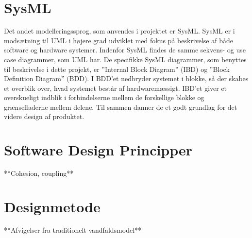 \section{SysML}
Det andet modelleringssprog, som anvendes i projektet er SysML. SysML er i modsætning til UML i højere grad udviklet med fokus på beskrivelse af både software og hardware systemer. Indenfor SysML findes de samme sekvens- og use case diagrammer, som UML har. De specifikke SysML diagrammer, som benyttes til beskrivelse i dette projekt, er ”Internal Block Diagram” (IBD) og ”Block Definition Diagram” (BDD). I BDD’et nedbryder systemet i blokke, så der skabes et overblik over, hvad systemet består af hardwaremæssigt. IBD’et giver et overskueligt indblik i forbindelserne mellem de forskellige blokke og grænsefladerne mellem delene. Til sammen danner de et godt grundlag for det videre design af produktet.



\section{Software Design Principper}

**Cohesion, coupling**

\section{Designmetode}

**Afvigelser fra traditionelt vandfaldsmodel**